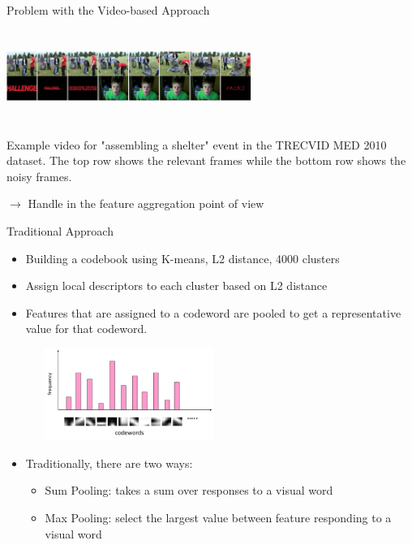 \documentclass{beamer}
\begin{document}
\begin{frame}[t]{Problem with the Video-based Approach}
\begin{center}
\includegraphics[width=8cm,height=3cm]{images/teaser_image.png}
\end{center}

Example video for "assembling a shelter" event in the TRECVID MED 2010 dataset. The top row shows the relevant frames while the bottom row shows the noisy frames.


$\rightarrow$ Handle in the feature aggregation point of view

\end{frame}

\begin{frame}[t]{Traditional Approach}

\begin{itemize}
\item Building a codebook using K-means, L2 distance, 4000 clusters
\item Assign local descriptors to each cluster based on L2 distance
\item Features that are assigned to a codeword are pooled to get a representative value for that codeword.
\end{itemize}
\begin{center}
\includegraphics[width=8cm,height=3cm]{images/bow.png}
\end{center}
\begin{itemize}
\item Traditionally, there are two ways:
\begin{itemize}
	\item Sum Pooling: takes a sum over responses to a visual word 
	\item Max Pooling: select the largest value between feature responding to a visual word
\end{itemize}
\end{itemize}

\end{frame}
\end{document}
